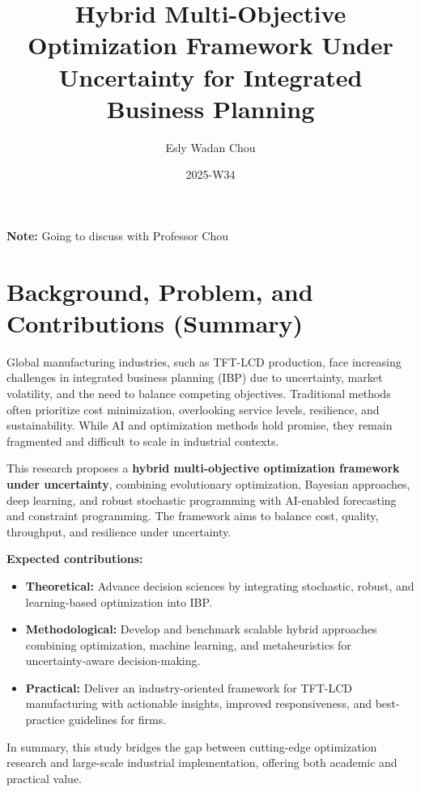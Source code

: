 \documentclass[12pt,a4paper]{article}
\title{Hybrid Multi-Objective Optimization Framework Under Uncertainty for Integrated Business Planning}
\author{Esly Wadan Chou}
\date{2025-W34}
\begin{document}
\maketitle

\noindent\textbf{Note:} Going to discuss with Professor Chou

\section{Background, Problem, and Contributions (Summary)}

Global manufacturing industries, such as TFT-LCD production, face increasing challenges in integrated business planning (IBP) due to uncertainty, market volatility, and the need to balance competing objectives. Traditional methods often prioritize cost minimization, overlooking service levels, resilience, and sustainability. While AI and optimization methods hold promise, they remain fragmented and difficult to scale in industrial contexts.

This research proposes a \textbf{hybrid multi-objective optimization framework under uncertainty}, combining evolutionary optimization, Bayesian approaches, deep learning, and robust stochastic programming with AI-enabled forecasting and constraint programming. The framework aims to balance cost, quality, throughput, and resilience under uncertainty.

\textbf{Expected contributions:}

\begin{itemize}[leftmargin=*]
    \item \textbf{Theoretical:} Advance decision sciences by integrating stochastic, robust, and learning-based optimization into IBP.
    
    \item \textbf{Methodological:} Develop and benchmark scalable hybrid approaches combining optimization, machine learning, and metaheuristics for uncertainty-aware decision-making.
    
    \item \textbf{Practical:} Deliver an industry-oriented framework for TFT-LCD manufacturing with actionable insights, improved responsiveness, and best-practice guidelines for firms.
\end{itemize}

In summary, this study bridges the gap between cutting-edge optimization research and large-scale industrial implementation, offering both academic and practical value.
\end{document}
